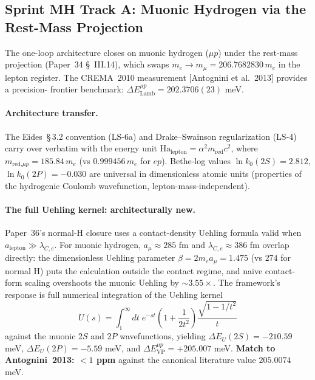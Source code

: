 \documentclass[11pt]{article}
\begin{document}
\subsection{Sprint MH Track A: Muonic Hydrogen via the Rest-Mass
Projection}
\label{sec:sprint_mh_track_a}

The one-loop architecture closes on muonic hydrogen ($\mu p$) under the
rest-mass projection (Paper~34 \S~III.14), which swaps
$m_e \to m_\mu = 206.7682830\, m_e$ in the lepton register.  The
CREMA~2010 measurement [Antognini et al.\ 2013] provides a precision-
frontier benchmark: $\Delta E^{\mu p}_\text{Lamb} = 202.3706(23)$ meV.

\paragraph{Architecture transfer.}  The Eides~\S\,3.2 convention
(LS-6a) and Drake--Swainson regularization (LS-4) carry over verbatim
with the energy unit
$\text{Ha}_\text{lepton} = \alpha^2 m_\text{red} c^2$, where
$m_\text{red,$\mu p$} = 185.84\, m_e$ (vs $0.999456\, m_e$ for $ep$).
Bethe-log values $\ln k_0(2S) = 2.812$, $\ln k_0(2P) = -0.030$ are
universal in dimensionless atomic units (properties of the hydrogenic
Coulomb wavefunction, lepton-mass-independent).

\paragraph{The full Uehling kernel: architecturally new.}  Paper~36's
normal-H closure uses a contact-density Uehling formula valid when
$a_\text{lepton} \gg \lambda_{C,e}$.  For muonic hydrogen,
$a_\mu \approx 285$ fm and $\lambda_{C,e} \approx 386$ fm overlap
directly: the dimensionless Uehling parameter $\beta = 2 m_e a_\mu
= 1.475$ (vs $274$ for normal H) puts the calculation outside the
contact regime, and naive contact-form scaling overshoots the muonic
Uehling by $\sim 3.55\times$.  The framework's response is full
numerical integration of the Uehling kernel
\begin{equation}
U(s) = \int_1^\infty \!\! dt \; e^{-st}
\left(1 + \frac{1}{2t^2}\right)
\frac{\sqrt{1 - 1/t^2}}{t}
\label{eq:uehling_kernel}
\end{equation}
against the muonic 2$S$ and 2$P$ wavefunctions, yielding
$\Delta E_U(2S) = -210.59$ meV, $\Delta E_U(2P) = -5.59$ meV, and
$\Delta E^{\mu p}_\text{VP} = +205.007$ meV.  \textbf{Match to
Antognini~2013: $<1$ ppm} against the canonical literature value
$205.0074$ meV.
\end{document}
